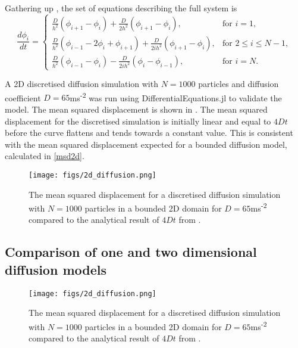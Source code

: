 Gathering up , the set of equations describing the full system is
%
  \begin{equation}
  \frac{d\phi_i}{dt} = \begin{cases}
  		\frac{D}{h^2}(\phi_{i+1} - \phi_{i}) + \frac{D}{2h^2} (\phi_{i+1}-\phi_i), & \text{for } i = 1, \\
  		\frac{D}{h^2}(\phi_{i-1}-2\phi_i +\phi_{i+1}) + \frac{D}{2ih^2} (\phi_{i+1}-\phi_{i}), & \text{for } 2 \leq i \leq N-1, \\
  		\frac{D}{h^2}(\phi_{i-1}-\phi_i) - \frac{D}{2ih^2} (\phi_{i}-\phi_{i-1}), & \text{for } i = N .
  		\end{cases}
          \label{eqn:discrete_diffusion2d}
  \end{equation}

 A 2D discretised diffusion simulation with $N=1000$ particles and diffusion coefficient $D=65$ms\textsuperscript{-2} was run using DifferentialEquations.jl \cite{DifferentialEquations} to validate the model. The mean squared displacement is shown in . The mean squared displacement for the discretised simulation is initially linear and equal to $4Dt$ before the curve flattens and tends towards a constant value. This is consistent with the mean squared displacement expected for a bounded diffusion model, calculated in \ref{msd2d}.

\begin{figure}
\centering
    \texttt{[image: figs/2d\_diffusion.png]}
    \caption{The mean squared displacement for a discretised diffusion simulation with $N=1000$ particles in a bounded 2D domain for $D=65$ms\textsuperscript{-2} compared to the analytical result of $4Dt$ from .}
\label{fig:2d_diffusion}
\end{figure}
%
\subsection{Comparison of one and two dimensional diffusion models}
%
\begin{figure}
\centering
    \texttt{[image: figs/2d\_diffusion.png]}
    \caption{The mean squared displacement for a discretised diffusion simulation with $N=1000$ particles in a bounded 2D domain for $D=65$ms\textsuperscript{-2} compared to the analytical result of $4Dt$ from .}
\label{fig:1d2d_diffusion}
\end{figure}
%
